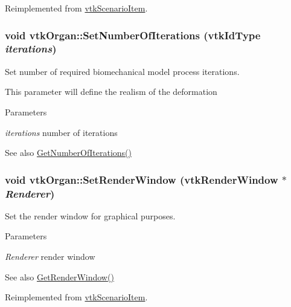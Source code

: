 Reimplemented from \hyperlink{classvtkScenarioItem_a199f87511e99386bb9f271d91c2d0caf}{vtkScenarioItem}.

\hypertarget{classvtkOrgan_a97ed046b7c9b8c3cc87939db46e4ec01}{
\subsubsection[{SetNumberOfIterations}]{\setlength{\rightskip}{0pt plus 5cm}void vtkOrgan::SetNumberOfIterations (vtkIdType {\em iterations})}}
\label{classvtkOrgan_a97ed046b7c9b8c3cc87939db46e4ec01}


Set number of required biomechanical model process iterations. 

This parameter will define the realism of the deformation 
\begin{DoxyParams}{Parameters}
\item[{\em iterations}]number of iterations \end{DoxyParams}
\begin{DoxySeeAlso}{See also}
\hyperlink{classvtkOrgan_a99aeadb34310d5ad8b7d8616ea8482ef}{GetNumberOfIterations()} 
\end{DoxySeeAlso}
\hypertarget{classvtkOrgan_a2b6a862da0f1ca6cd192138cdd00b04b}{
\subsubsection[{SetRenderWindow}]{\setlength{\rightskip}{0pt plus 5cm}void vtkOrgan::SetRenderWindow (vtkRenderWindow $\ast$ {\em Renderer})}}
\label{classvtkOrgan_a2b6a862da0f1ca6cd192138cdd00b04b}


Set the render window for graphical purposes. 


\begin{DoxyParams}{Parameters}
\item[{\em Renderer}]render window \end{DoxyParams}
\begin{DoxySeeAlso}{See also}
\hyperlink{classvtkOrgan_ae670e2727313073a9659a2795ce64c98}{GetRenderWindow()} 
\end{DoxySeeAlso}


Reimplemented from \hyperlink{classvtkScenarioItem_a3ce404404d36c342b947f29fa02b6170}{vtkScenarioItem}.

